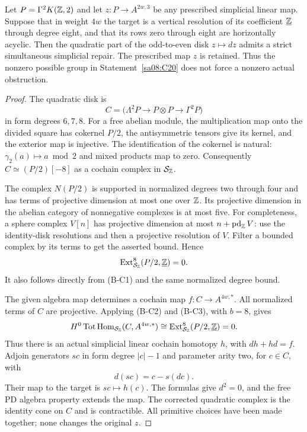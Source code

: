 \begin{proposition}
\label{sa08:C22}
Let $P=\Gamma^2K(\mathbb Z,2)$ and let
$z:P\to A^{2w,3}$ be any prescribed simplicial
linear map. Suppose that in weight $4w$ the
target is a vertical resolution of its
coefficient $\underline{\mathbb Z}$ through degree
eight, and that its rows zero through eight
are horizontally acyclic. Then the quadratic
part of the odd-to-even disk $z\mapsto dz$
admits a strict simultaneous simplicial repair.
The prescribed map $z$ is retained. Thus the
nonzero possible group in Statement~\ref{sa08:C20}
does not force a nonzero actual obstruction.
\end{proposition}
\begin{proof}
The quadratic disk is
\[
 C=\bigl(\Lambda^2P\longrightarrow P\otimes P
             \longrightarrow\Gamma^2P\bigr)
\]
in form degrees $6,7,8$. For a free abelian
module, the multiplication map onto the
divided square has cokernel $P/2$, the
antisymmetric tensors give its kernel,
and the exterior map is injective.
The identification of the cokernel is natural:
$\gamma_2(a)\mapsto a\bmod2$ and mixed
products map to zero. Consequently
$C\simeq(P/2)[-8]$ as a cochain complex
in $\mathcal S_{\mathbb Z}$.

The complex $N(P/2)$ is supported in normalized
degrees two through four and has terms of
projective dimension at most one over $\mathbb Z$.
Its projective dimension in the abelian
category of nonnegative complexes is at
most five. For completeness, a sphere
complex $V[n]$ has projective dimension
at most $n+\operatorname{pd}_{\mathbb Z}V$:
use the identity-disk resolutions and
then a projective resolution of $V$.
Filter a bounded complex by its terms
to get the asserted bound. Hence
\[
 \operatorname{Ext}^8_{\mathcal S_{\mathbb Z}}
       (P/2,\underline{\mathbb Z})=0.
\]
It also follows directly from (B-C1) and
the same normalized degree bound.

The given algebra map determines a cochain
map $f:C\to A^{4w,*}$. All normalized terms
of $C$ are projective. Applying (B-C2)
and (B-C3), with $b=8$, gives
\[
 H^0\operatorname{Tot}\operatorname{Hom}_{\mathcal S_{\mathbb Z}}
       (C,A^{4w,*})
 \cong
 \operatorname{Ext}^8_{\mathcal S_{\mathbb Z}}
       (P/2,\underline{\mathbb Z})=0.
\]
Thus there is an actual simplicial linear
cochain homotopy $h$, with $dh+hd=f$.
Adjoin generators $sc$ in form degree
$|c|-1$ and parameter arity two, for
$c\in C$, with
\[
 d(sc)=c-s(dc).
\]
Their map to the target is $sc\mapsto h(c)$.
The formulas give $d^2=0$, and the free
PD algebra property extends the map.
The corrected quadratic complex is the
identity cone on $C$ and is contractible.
All primitive choices have been made
together; none changes the original $z$.
\end{proof}

